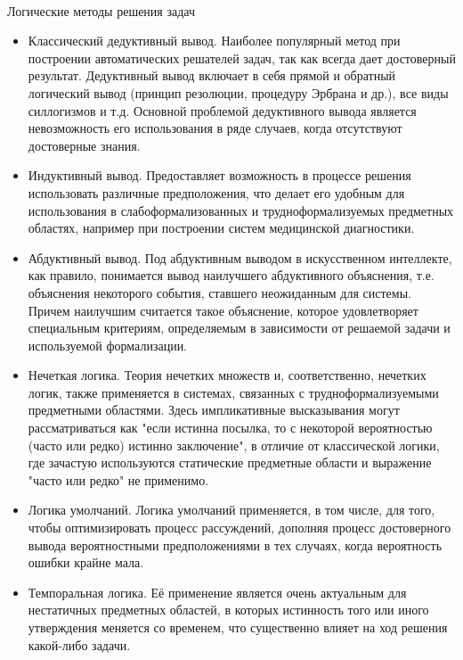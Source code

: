 \begin{frame}{\\Логические методы решения задач}
\topline
    \vspace{10pt}
     \\
     
    \begin{itemize}
        \item Классический дедуктивный вывод. Наиболее популярный метод при построении автоматических решателей задач, так как всегда дает достоверный результат. Дедуктивный вывод включает в себя прямой и обратный логический вывод (принцип резолюции, процедуру Эрбрана и др.), все виды силлогизмов и т.д. Основной проблемой дедуктивного вывода является невозможность его использования в ряде случаев, когда отсутствуют достоверные знания.
        \item Индуктивный вывод. Предоставляет возможность в процессе решения использовать различные предположения, что делает его удобным для использования в слабоформализованных и трудноформализуемых предметных областях, например при построении систем медицинской диагностики.
    \end{itemize}
\end{frame}
\begin{frame}{}
    \begin{itemize}
        \item  Абдуктивный вывод. Под абдуктивным выводом в искусственном интеллекте, как правило, понимается вывод наилучшего абдуктивного объяснения, т.е. объяснения некоторого события, ставшего неожиданным для системы. Причем наилучшим считается такое объяснение, которое удовлетворяет специальным критериям, определяемым в зависимости от решаемой задачи и используемой формализации.
        \item Нечеткая логика. Теория нечетких множеств и, соответственно, нечетких логик, также применяется в системах, связанных с трудноформализуемыми предметными областями. Здесь импликативные высказывания могут рассматриваться как "если истинна посылка, то с некоторой вероятностью (часто или редко) истинно заключение", в отличие от классической логики, где зачастую используются статические предметные области и выражение "часто или редко" не применимо. 
    \end{itemize}
\end{frame}
\begin{frame}{}
    \begin{itemize}
        \item Логика умолчаний. Логика умолчаний применяется, в том числе, для того, чтобы оптимизировать процесс рассуждений, дополняя процесс достоверного вывода вероятностными предположениями в тех случаях, когда вероятность ошибки крайне мала. 
        \item Темпоральная логика. Её применение является очень актуальным для нестатичных предметных областей, в которых истинность того или иного утверждения меняется со временем, что существенно влияет на ход решения какой-либо задачи.      
    \end{itemize}  
\end{frame}


